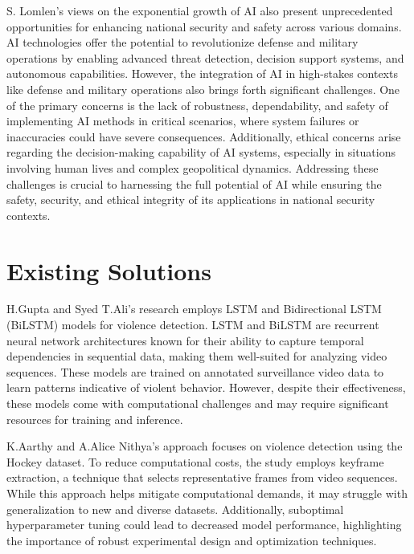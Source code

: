 \clearpage

\noindent S. Lomlen's views on the exponential growth of AI \cite{ai_national_security} also present unprecedented opportunities for enhancing national security and safety across various domains. AI technologies offer the potential to revolutionize defense and military operations by enabling advanced threat detection, decision support systems, and autonomous capabilities. However, the integration of AI in high-stakes contexts like defense and military operations also brings forth significant challenges. One of the primary concerns is the lack of robustness, dependability, and safety of implementing AI methods in critical scenarios, where system failures or inaccuracies could have severe consequences. Additionally, ethical concerns arise regarding the decision-making capability of AI systems, especially in situations involving human lives and complex geopolitical dynamics. Addressing these challenges is crucial to harnessing the full potential of AI while ensuring the safety, security, and ethical integrity of its applications in national security contexts.

\section{Existing Solutions}

\noindent H.Gupta and Syed T.Ali's research \cite{lstm&bilstm} employs LSTM and Bidirectional LSTM (BiLSTM) models for violence detection. LSTM and BiLSTM are recurrent neural network architectures known for their ability to capture temporal dependencies in sequential data, making them well-suited for analyzing video sequences. These models are trained on annotated surveillance video data to learn patterns indicative of violent behavior. However, despite their effectiveness, these models come with computational challenges and may require significant resources for training and inference.

\noindent K.Aarthy and A.Alice Nithya's approach \cite{hockey} focuses on violence detection using the Hockey dataset. To reduce computational costs, the study employs keyframe extraction, a technique that selects representative frames from video sequences. While this approach helps mitigate computational demands, it may struggle with generalization to new and diverse datasets. Additionally, suboptimal hyperparameter tuning could lead to decreased model performance, highlighting the importance of robust experimental design and optimization techniques.

